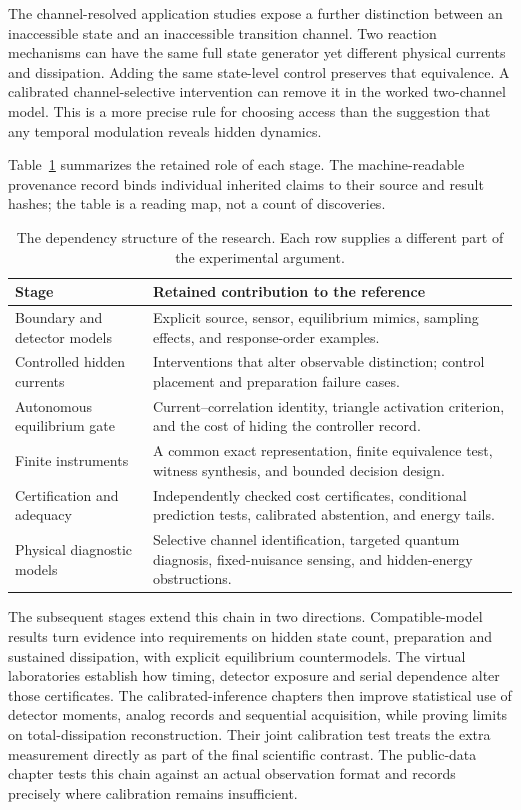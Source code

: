 The channel-resolved application studies expose a further distinction between an
inaccessible state and an inaccessible transition channel. Two reaction
mechanisms can have the same full state generator yet different physical
currents and dissipation. Adding the same state-level control preserves that
equivalence. A calibrated channel-selective intervention can remove it in the
worked two-channel model. This is a more precise rule for choosing access
than the suggestion that any temporal modulation reveals hidden dynamics.

Table~\ref{researchmap:lineage} summarizes the retained role of each stage.
The machine-readable provenance record binds individual inherited claims to
their source and result hashes; the table is a reading map, not a count of
discoveries.

\begin{table}[htbp]
\centering\small
\begin{tabular}{p{}p{}}
\hline
Stage & Retained contribution to the reference\\
\hline
Boundary and detector models & Explicit source, sensor, equilibrium mimics,
sampling effects, and response-order examples.\\[2pt]
Controlled hidden currents & Interventions that alter observable distinction;
control placement and preparation failure cases.\\[2pt]
Autonomous equilibrium gate & Current--correlation identity, triangle
activation criterion, and the cost of hiding the controller record.\\[2pt]
Finite instruments & A common exact representation, finite equivalence
test, witness synthesis, and bounded decision design.\\[2pt]
Certification and adequacy & Independently checked cost certificates,
conditional prediction tests, calibrated abstention, and energy tails.\\[2pt]
Physical diagnostic models & Selective channel identification, targeted
quantum diagnosis, fixed-nuisance sensing, and hidden-energy obstructions.\\
\hline
\end{tabular}
\caption{The dependency structure of the research. Each row supplies a
different part of the experimental argument.}
\label{researchmap:lineage}
\end{table}

The subsequent stages extend this chain in two directions. Compatible-model
results turn evidence into requirements on hidden state count, preparation and
sustained dissipation, with explicit equilibrium countermodels. The virtual
laboratories establish how timing, detector exposure and serial dependence
alter those certificates. The calibrated-inference chapters then improve
statistical use of detector moments, analog records and sequential acquisition,
while proving limits on total-dissipation reconstruction. Their joint
calibration test treats the extra measurement directly as part of the final
scientific contrast. The public-data chapter tests this chain against an
actual observation format and records precisely where calibration remains
insufficient.

